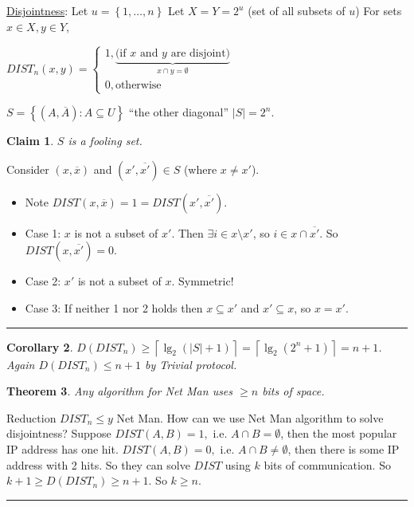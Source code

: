 \documentclass[twoside]{article}
\newcounter{lecnum}
\newtheorem{theorem}{Theorem}[lecnum]
\newtheorem{claim}[theorem]{Claim}
\newtheorem{corollary}[theorem]{Corollary}
\newenvironment{proof}{{\bf Proof:}}{\hfill\rule{2mm}{2mm}}
\newcommand{\set}[1]{\left \{ #1 \right \}}
\newcommand{\abs}[1]{\left | #1 \right |}
\newcommand{\ceil}[1]{\left \lceil #1 \right \rceil }
\begin{document}
\underline{Disjointness}: Let $u = \set{1, \ldots, n}$ Let $X = Y = 2^u$ (set of all subsets of $u$) For sets $x \in X, y \in Y$,

$DIST_n(x, y) =
\begin{cases}
    1, \underbrace{\text{(if $x$ and $y$ are disjoint)}}_{x \cap y = \emptyset} \\
    0, \text{otherwise}
\end{cases}$

$S = \set{(A, \overline{A}): A \subseteq U}$ ``the other diagonal'' $\abs{S} = 2^n$.

\begin{claim}
    $S$ is a fooling set.
\end{claim}

\begin{proof}
    Consider $(x, \overline{x})$ and $(x', \overline{x'}) \in S$ (where $x \neq x'$).

    \begin{itemize}
        \item Note $DIST(x, \overline{x}) = 1 = DIST(x', \overline{x'})$.
        \item Case 1: $x$ is not a subset of $x'$. Then $\exists i \in x \setminus x'$, so $i \in x \cap \overline{x'}$. So $DIST(x, \overline{x'}) = 0$.
        \item Case 2: $x'$ is not a subset of $x$. Symmetric!
        \item Case 3: If neither 1 nor 2 holds then $x \subseteq x'$ and $x' \subseteq x$, so $x = x'$.
    \end{itemize}
\end{proof}

\begin{corollary}
    $D(DIST_n) \geq \ceil{\lg_2(\abs{S} + 1)} = \ceil{\lg_2(2^n + 1)} = n + 1$. Again $D(DIST_n) \leq n + 1$ by Trivial protocol.
\end{corollary}

\begin{theorem}
    Any algorithm for Net Man uses $\geq n$ bits of space.
\end{theorem}

\begin{proof}
    Reduction $DIST_n \leq y$ Net Man. How can we use Net Man algorithm to solve disjointness? Suppose $DIST(A, B) = 1, $ i.e. $A \cap B = \emptyset$, then the most popular IP address has one hit. $DIST(A, B) = 0, $ i.e. $A \cap B \neq \emptyset$, then there is some IP address with 2 hits. So they can solve $DIST$ using $k$ bits of communication. So $k + 1 \geq D(DIST_n) \geq n + 1$. So $k \geq n$.
\end{proof}
\end{document}
